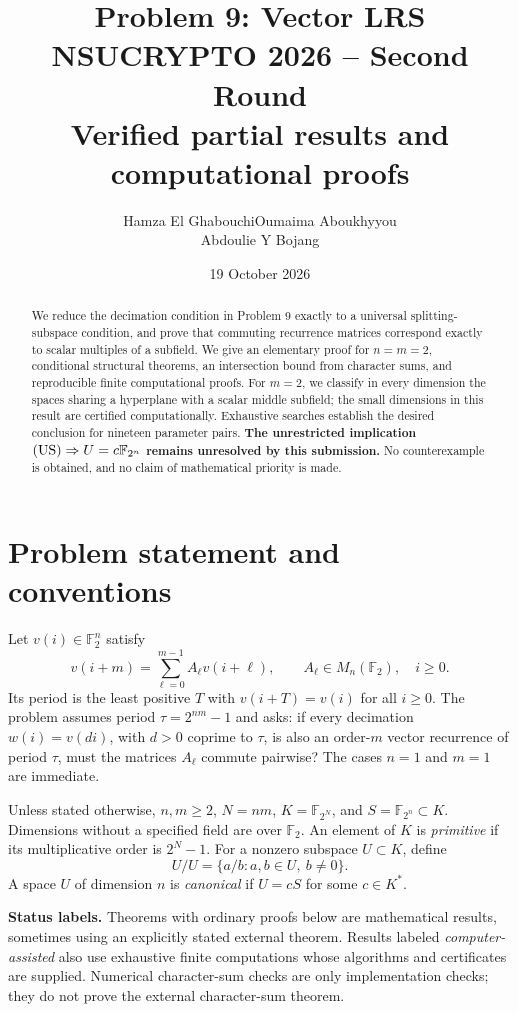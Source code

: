 \documentclass[11pt,a4paper]{article}
\title{\textbf{Problem 9: Vector LRS}\\[3pt]
\large NSUCRYPTO 2026 -- Second Round\\[3pt]
Verified partial results and computational proofs}
\author{Hamza El Ghabouchi\qquad Oumaima Aboukhyyou\\[3pt] Abdoulie Y Bojang}
\date{19 October 2026}
\theoremstyle{definition}\newtheorem{definition}[theorem]{Definition}
\theoremstyle{remark}\newtheorem{remark}[theorem]{Remark}
\newcommand{\F}{\mathbb F}
\newcommand{\US}{\textup{(US)}}
\numberwithin{equation}{section}
\begin{document}
\maketitle
\begin{abstract}
We reduce the decimation condition in Problem 9 exactly to a universal splitting-subspace condition, and prove that commuting recurrence matrices correspond exactly to scalar multiples of a subfield. We give an elementary proof for $n=m=2$, conditional structural theorems, an intersection bound from character sums, and reproducible finite computational proofs. For $m=2$, we classify in every dimension the spaces sharing a hyperplane with a scalar middle subfield; the small dimensions in this result are certified computationally. Exhaustive searches establish the desired conclusion for nineteen parameter pairs. \textbf{The unrestricted implication $\US\Rightarrow U=c\F_{2^n}$ remains unresolved by this submission.} No counterexample is obtained, and no claim of mathematical priority is made.
\end{abstract}

\section{Problem statement and conventions}
Let $v(i)\in\F_2^n$ satisfy
\begin{equation}\label{eq:recurrence}
v(i+m)=\sum_{\ell=0}^{m-1}A_\ell v(i+\ell),\qquad A_\ell\in M_n(\F_2),\quad i\ge0.
\end{equation}
Its period is the least positive $T$ with $v(i+T)=v(i)$ for all $i\ge0$. The problem assumes period $\tau=2^{nm}-1$ and asks: if every decimation $w(i)=v(di)$, with $d>0$ coprime to $\tau$, is also an order-$m$ vector recurrence of period $\tau$, must the matrices $A_\ell$ commute pairwise? The cases $n=1$ and $m=1$ are immediate.

Unless stated otherwise, $n,m\ge2$, $N=nm$, $K=\F_{2^N}$, and $S=\F_{2^n}\subset K$. Dimensions without a specified field are over $\F_2$. An element of $K$ is \emph{primitive} if its multiplicative order is $2^N-1$. For a nonzero subspace $U\subset K$, define
\[
U/U=\{a/b:a,b\in U,\ b\ne0\}.
\]
A space $U$ of dimension $n$ is \emph{canonical} if $U=cS$ for some $c\in K^*$.

\textbf{Status labels.} Theorems with ordinary proofs below are mathematical results, sometimes using an explicitly stated external theorem. Results labeled \emph{computer-assisted} also use exhaustive finite computations whose algorithms and certificates are supplied. Numerical character-sum checks are only implementation checks; they do not prove the external character-sum theorem.
\end{document}
